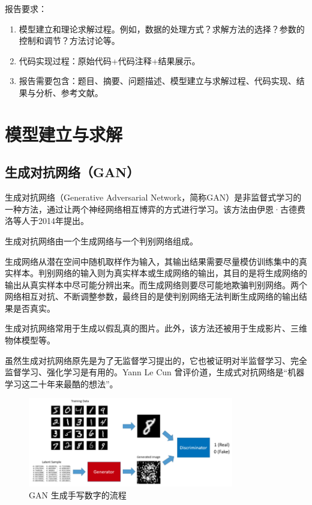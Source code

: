\documentclass[a4paper, 12pt]{article}
\begin{document}
报告要求：
\begin{enumerate}[leftmargin=*,labelindent=2em]
\item 模型建立和理论求解过程。例如，数据的处理方式？求解方法的选择？参数的控制和调节？方法讨论等。
\item 代码实现过程：原始代码+代码注释+结果展示。
\item 报告需要包含：题目、摘要、问题描述、模型建立与求解过程、代码实现、结果与分析、参考文献。
\end{enumerate}

\section{模型建立与求解}
\subsection{生成对抗网络（GAN）}

生成对抗网络（Generative Adversarial Network，简称GAN）是非监督式学习的一种方法，通过让两个神经网络相互博弈的方式进行学习。该方法由伊恩·古德费洛等人于2014年提出。

生成对抗网络由一个生成网络与一个判别网络组成。

生成网络从潜在空间中随机取样作为输入，其输出结果需要尽量模仿训练集中的真实样本。判别网络的输入则为真实样本或生成网络的输出，其目的是将生成网络的输出从真实样本中尽可能分辨出来。而生成网络则要尽可能地欺骗判别网络。两个网络相互对抗、不断调整参数，最终目的是使判别网络无法判断生成网络的输出结果是否真实。

生成对抗网络常用于生成以假乱真的图片。此外，该方法还被用于生成影片、三维物体模型等。

虽然生成对抗网络原先是为了无监督学习提出的，它也被证明对半监督学习、完全监督学习、强化学习是有用的。Yann Le Cun 曾评价道，生成式对抗网络是“机器学习这二十年来最酷的想法”。

\begin{figure}[htbp]
\centering
\includegraphics[width=0.8\textwidth]{images/gan_structure.png}
\caption{GAN 生成手写数字的流程}
\end{figure}
\end{document}
